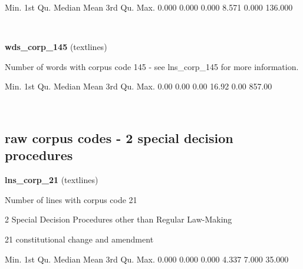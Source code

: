 \documentclass[]{article}
\newenvironment{Shaded}{\begin{snugshade}}{\end{snugshade}}
\newcommand{\FloatTok}[1]{\textcolor[rgb]{0.00,0.00,0.81}{{#1}}}
\newcommand{\NormalTok}[1]{{#1}}
\begin{document}
\begin{Shaded}
\begin{Highlighting}[]
   \NormalTok{Min. 1st Qu.  Median    Mean 3rd Qu.    Max. }
  \FloatTok{0.000}   \FloatTok{0.000}   \FloatTok{0.000}   \FloatTok{8.571}   \FloatTok{0.000} \FloatTok{136.000} 
\end{Highlighting}
\end{Shaded}

~

\vspace{1em}

\textbf{wds\_corp\_145} (textlines)

Number of words with corpus code 145 - see lns\_corp\_145 for more
information.

\begin{Shaded}
\begin{Highlighting}[]
   \NormalTok{Min. 1st Qu.  Median    Mean 3rd Qu.    Max. }
   \FloatTok{0.00}    \FloatTok{0.00}    \FloatTok{0.00}   \FloatTok{16.92}    \FloatTok{0.00}  \FloatTok{857.00} 
\end{Highlighting}
\end{Shaded}

~

\vspace{1em}

\subsection{raw corpus codes - 2 special decision
procedures}\label{raw-corpus-codes---2-special-decision-procedures}

\textbf{lns\_corp\_21} (textlines)

Number of lines with corpus code 21

2 Special Decision Procedures other than Regular Law-Making

21 constitutional change and amendment

\begin{Shaded}
\begin{Highlighting}[]
   \NormalTok{Min. 1st Qu.  Median    Mean 3rd Qu.    Max. }
  \FloatTok{0.000}   \FloatTok{0.000}   \FloatTok{0.000}   \FloatTok{4.337}   \FloatTok{7.000}  \FloatTok{35.000} 
\end{Highlighting}
\end{Shaded}

~

\vspace{1em}
\end{document}
